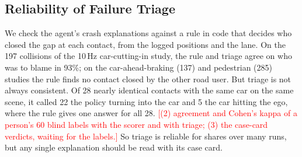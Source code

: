\documentclass[conference]{IEEEtran}
\newcommand{\guide}[1]{}
\newcommand{\verify}[1]{\textcolor{red}{[#1]}}
\begin{document}
\subsection{Reliability of Failure Triage}\label{sec:triage}
\guide{Check how far the agent's explanation of each failure can be trusted, against code and against people. (1) Against a rule in code that decides who closed the gap at the contact: on the collision failures of the car studies, how often the rule and triage agree on whether the ego or the other car was to blame, and where they disagree, including nearly identical contacts that triage labelled differently. (2) Against people: a person labels who caused each of 60 randomly drawn crashes without seeing the scorer or the triage; report agreement and Cohen's kappa with the scorer and with the triage. (3) A person marks each case card as making sense or not, including the hardest cases where triage and the scorer disagree. Close with what the failure types in Sec.~\ref{sec:cases} can and cannot be trusted for. \emph{Part (1) is done; (2) and (3) wait for the human labels and verdicts. Report (1)--(3) in one small table (check, cases, agreement, kappa); no figure is needed.}}

We check the agent's crash explanations against a rule in code that decides who closed the gap at each contact, from the logged positions and the lane. On the 197 collisions of the 10\,Hz car-cutting-in study, the rule and triage agree on who was to blame in 93\%; on the car-ahead-braking (137) and pedestrian (285) studies the rule finds no contact closed by the other road user. But triage is not always consistent. Of 28 nearly identical contacts with the same car on the same scene, it called 22 the policy turning into the car and 5 the car hitting the ego, where the rule gives one answer for all 28. \verify{(2) agreement and Cohen's kappa of a person's 60 blind labels with the scorer and with triage; (3) the case-card verdicts, waiting for the labels.} So triage is reliable for shares over many runs, but any single explanation should be read with its case card.
\end{document}
